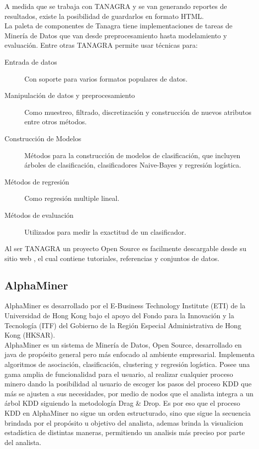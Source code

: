 A medida que se trabaja con TANAGRA y se van generando reportes de resultados, existe la posibilidad de
guardarlos en formato HTML.\\

La paleta de componentes de Tanagra tiene implementaciones de tareas de Miner\'ia de Datos que van desde
preprocesamiento hasta modelamiento y evaluaci\'on. Entre otras TANAGRA permite usar t\'ecnicas para:

\begin{description}
\item [Entrada de datos] Con soporte para varios formatos populares de datos.
\item [Manipulaci\'on de datos y preprocesamiento] Como muestreo, filtrado, discretizaci\'on y construcci\'on de nuevos atributos entre otros m\'etodos.
\item [Construcci\'on de Modelos] M\'etodos para la construcci\'on de modelos de clasificaci\'on, que incluyen \'arboles de clasificaci\'on, clasificadores Naive-Bayes y regresi\'on log\'istica.
\item [M\'etodos de regresi\'on] Como regresi\'on multiple lineal.
\item [M\'etodos de evaluaci\'on] Utilizados para medir la exactitud de un clasificador.
\end{description}

Al ser TANAGRA un proyecto Open Source es facilmente descargable desde su sitio web \cite{tana}, el cual contiene
tutoriales, referencias y conjuntos de datos.

\subsection{AlphaMiner}

AlphaMiner es desarrollado por el E-Business Technology Institute (ETI) de la Universidad de Hong Kong \cite{eti}
bajo el apoyo del Fondo para la Innovaci\'on y la Tecnolog\'ia (ITF) \cite{itf} del Gobierno de la Regi\'on
Especial Admi\-nistrativa de Hong Kong (HKSAR).\\

AlphaMiner es un sistema de Miner\'ia de Datos, Open Source, desarro\-llado en java de prop\'osito general pero
m\'as enfocado al ambiente  empresa\-rial. Implementa algoritmos de asociaci\'on, clasificaci\'on, clustering y
regresi\'on log\'istica. Posee una gama amplia de funcionalidad para el usuario, al realizar cualquier proceso
minero dando la posibilidad al usuario de escoger los pasos del proceso KDD que m\'as se ajusten a sus
necesidades, por medio de nodos que el analista integra a un \'arbol KDD siguiendo la metodolog\'ia Drag \& Drop. 
Es por eso que el proceso KDD en AlphaMiner no sigue un orden estructurado, sino que sigue la secuencia  brindada
por el prop\'osito u objetivo  del analista, ademas brinda la visualicion estad\'istica de distintas maneras, 
permitiendo un analisis m\'as preciso por parte del analista.\\

